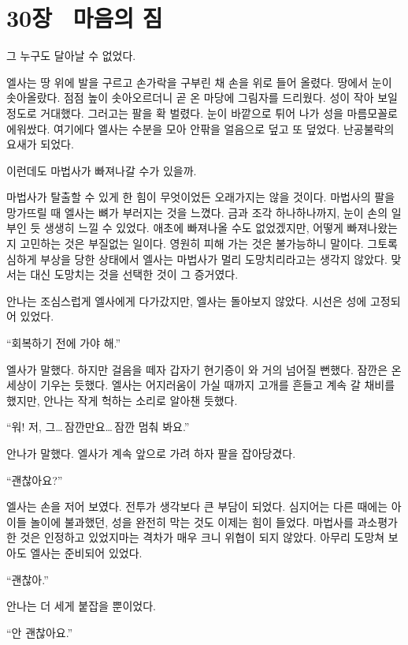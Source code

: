 

\chapter[30장  마음의 짐][30장\hspace*{.5em}마음의 짐]{30장 \ 마음의 짐}



그 누구도 달아날 수 없었다.

엘사는 땅 위에 발을 구르고 손가락을 구부린 채 손을 위로 들어 올렸다. 땅에서 눈이 솟아올랐다. 점점 높이 솟아오르더니 곧 온 마당에 그림자를 드리웠다. 성이 작아 보일 정도로 거대했다. 그러고는 팔을 확 벌렸다. 눈이 바깥으로 튀어 나가 성을 마름모꼴로 에워쌌다. 여기에다 엘사는 수분을 모아 안팎을 얼음으로 덮고 또 덮었다. 난공불락의 요새가 되었다.

이런데도 마법사가 빠져나갈 수가 있을까.

마법사가 탈출할 수 있게 한 힘이 무엇이었든 오래가지는 않을 것이다. 마법사의 팔을 망가뜨릴 때 엘사는 뼈가 부러지는 것을 느꼈다. 금과 조각 하나하나까지, 눈이 손의 일부인 듯 생생히 느낄 수 있었다. 애초에 빠져나올 수도 없었겠지만, 어떻게 빠져나왔는지 고민하는 것은 부질없는 일이다. 영원히 피해 가는 것은 불가능하니 말이다. 그토록 심하게 부상을 당한 상태에서 엘사는 마법사가 멀리 도망치리라고는 생각지 않았다. 맞서는 대신 도망치는 것을 선택한 것이 그 증거였다.

안나는 조심스럽게 엘사에게 다가갔지만, 엘사는 돌아보지 않았다. 시선은 성에 고정되어 있었다.

``회복하기 전에 가야 해.''

엘사가 말했다. 하지만 걸음을 떼자 갑자기 현기증이 와 거의 넘어질 뻔했다. 잠깐은 온 세상이 기우는 듯했다. 엘사는 어지러움이 가실 때까지 고개를 흔들고 계속 갈 채비를 했지만, 안나는 작게 헉하는 소리로 알아챈 듯했다.

``워! 저, 그\ldots\,잠깐만요\ldots\,잠깐 멈춰 봐요.''

안나가 말했다. 엘사가 계속 앞으로 가려 하자 팔을 잡아당겼다.

``괜찮아요?''

엘사는 손을 저어 보였다. 전투가 생각보다 큰 부담이 되었다. 심지어는 다른 때에는 아이들 놀이에 불과했던, 성을 완전히 막는 것도 이제는 힘이 들었다. 마법사를 과소평가한 것은 인정하고 있었지마는 격차가 매우 크니 위협이 되지 않았다. 아무리 도망쳐 보아도 엘사는 준비되어 있었다.

``괜찮아.''

안나는 더 세게 붙잡을 뿐이었다.

``안 괜찮아요.''

